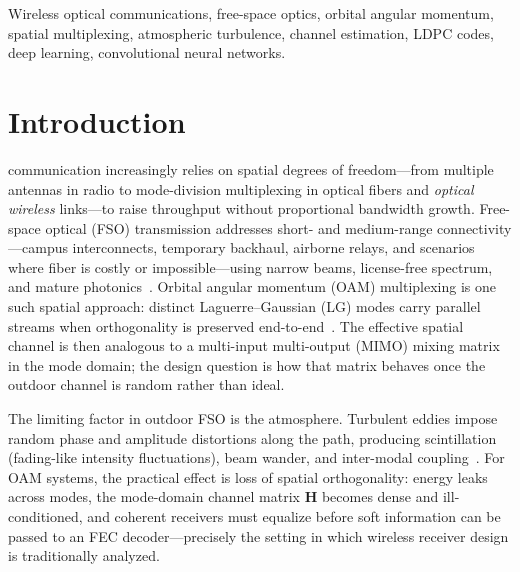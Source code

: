 \documentclass[journal]{IEEEtran}
\begin{document}
\begin{IEEEkeywords}
Wireless optical communications, free-space optics, orbital angular momentum, spatial multiplexing, atmospheric turbulence, channel estimation, LDPC codes, deep learning, convolutional neural networks.
\end{IEEEkeywords}

\section{Introduction}
\label{sec:intro}

 communication increasingly relies on spatial degrees of freedom---from multiple antennas in radio to mode-division multiplexing in optical fibers and \emph{optical wireless} links---to raise throughput without proportional bandwidth growth. Free-space optical (FSO) transmission addresses short- and medium-range connectivity---campus interconnects, temporary backhaul, airborne relays, and scenarios where fiber is costly or impossible---using narrow beams, license-free spectrum, and mature photonics~\cite{khalighi2014survey, kaushal2016optical}. Orbital angular momentum (OAM) multiplexing is one such spatial approach: distinct Laguerre--Gaussian (LG) modes carry parallel streams when orthogonality is preserved end-to-end~\cite{allen1992orbital, wang2012terabit, willner2015optical}. The effective spatial channel is then analogous to a multi-input multi-output (MIMO) mixing matrix in the mode domain; the design question is how that matrix behaves once the outdoor channel is random rather than ideal.

The limiting factor in outdoor FSO is the atmosphere. Turbulent eddies impose random phase and amplitude distortions along the path, producing scintillation (fading-like intensity fluctuations), beam wander, and inter-modal coupling~\cite{andrews2005laser, paterson2005atmospheric, ren2013atmospheric}. For OAM systems, the practical effect is loss of spatial orthogonality: energy leaks across modes, the mode-domain channel matrix $\mathbf{H}$ becomes dense and ill-conditioned, and coherent receivers must equalize before soft information can be passed to an FEC decoder---precisely the setting in which wireless receiver design is traditionally analyzed.
\end{document}
